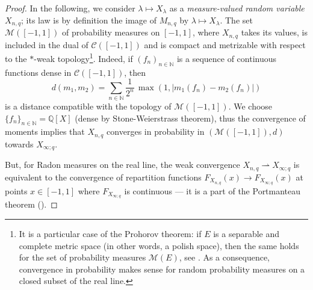 \documentclass[10pt]{amsart}
\theoremstyle{remark}
\newcommand{\N}{\mathbb{N}}
\begin{document}
\begin{proof}
In the following, we consider $\lambda \mapsto X_\lambda$ as a \emph{measure-valued random variable} $X_{n,q}$; its law  is by definition the image of $M_{n,q}$ by $\lambda \mapsto X_\lambda$. The set $\mathscr{M}([-1,1])$ of probability measures on $[-1,1]$, where $X_{n,q}$ takes its values, is included in the dual of $\mathscr{C}([-1,1])$ and is compact and metrizable with respect to the $*$-weak topology\footnote{It is a particular case of the Prohorov theorem: if $E$ is a separable and complete metric space (in other words, a polish space), then the same holds for the set of probability measures $\mathscr{M}(E)$, see \cite[Chapter 1]{Bil69}. As a consequence, convergence in probability makes sense for random probability measures on a closed subset of the real line.}. Indeed, if $(f_n)_{n \in \N}$ is a sequence of continuous functions dense in $\mathscr{C}([-1,1])$, then
$$d(m_1,m_2)=\sum_{n \in \N} \frac{1}{2^n} \,\max(1,|m_1(f_n)-m_2(f_n)|)$$
is a distance compatible with the topology of $\mathscr{M}([-1,1])$. We choose $\{f_n\}_{n \in \N}=\mathbb{Q}[X]$ (dense by Stone-Weierstrass theorem), thus the convergence of moments implies that $X_{n,q}$ converges in probability in $(\mathscr{M}([-1,1]),d)$ towards $X_{\infty;q}$.\bigskip

\noindent But, for Radon measures on the real line, the weak convergence $X_{n,q} \rightharpoonup X_{\infty;q}$ is equivalent to the convergence of repartition functions $F_{X_{n,q}}(x) \to F_{X_{\infty;q}}(x)$ at points $x \in [-1,1]$ where $F_{X_{\infty;q}}$ is continuous --- it is a part of the Portmanteau theorem (\cite[Chapter1]{Bil69}).
\end{proof}\bigskip
\end{document}
